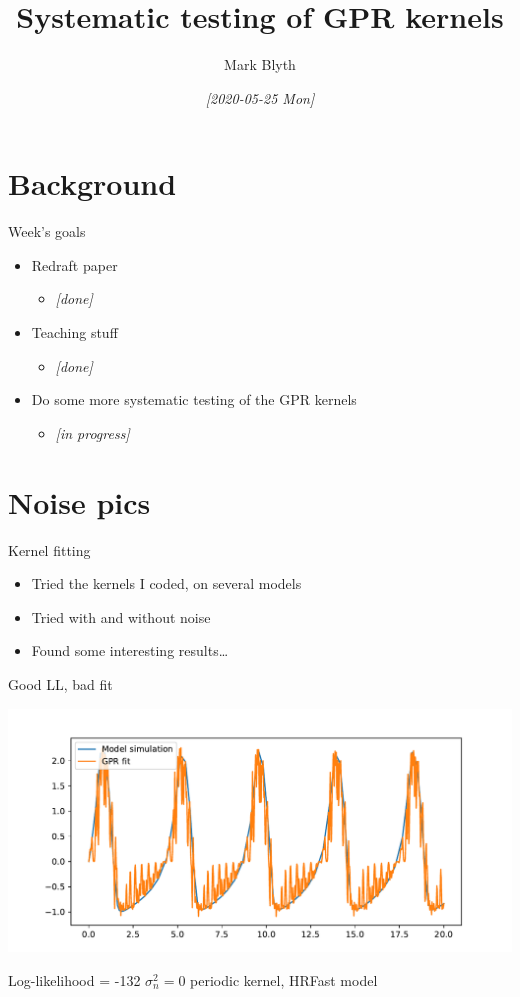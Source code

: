 \documentclass[presentation]{beamer}
\author{Mark Blyth}
\date{\textit{[2020-05-25 Mon]}}
\title{Systematic testing of GPR kernels}
\begin{document}
\maketitle

\section{Background}
\label{sec:org57afbde}
\begin{frame}[label={sec:org416965d}]{Week's goals}
\begin{itemize}
\item Redraft paper 
\begin{itemize}
\item \emph{[done]}
\end{itemize}
\item Teaching stuff 
\begin{itemize}
\item \emph{[done]}
\end{itemize}
\item Do some more systematic testing of the GPR kernels
\begin{itemize}
\item \emph{[in progress]}
\end{itemize}
\end{itemize}
\end{frame}

\section{Noise pics}
\label{sec:org27dcaf9}
\begin{frame}[label={sec:org61bd94c}]{Kernel fitting}
\begin{itemize}
\item Tried the kernels I coded, on several models
\item Tried with and without noise
\item Found some interesting results\ldots{}
\end{itemize}
\end{frame}

\begin{frame}[label={sec:org0665012}]{Good LL, bad fit}
\begin{center}
\includegraphics[width=.9\textwidth]{./HRFast_standard.pdf}
\end{center}

Log-likelihood = -132  \hfill \(\sigma_n^2=0\) \hfill periodic kernel, HRFast model
\end{frame}
\end{document}
